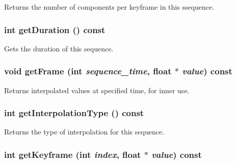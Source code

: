 Returns the number of components per keyframe in this ssequence. \hypertarget{classm3g_1_1KeyframeSequence_995a5ca5c8c3c993ef167f67cbb5fabe}{
\subsubsection[{getDuration}]{\setlength{\rightskip}{0pt plus 5cm}int getDuration () const}}
\label{classm3g_1_1KeyframeSequence_995a5ca5c8c3c993ef167f67cbb5fabe}


Gets the duration of this sequence. \hypertarget{classm3g_1_1KeyframeSequence_89be810f096d4f4f6028ca556c7f5f05}{
\subsubsection[{getFrame}]{\setlength{\rightskip}{0pt plus 5cm}void getFrame (int {\em sequence\_\-time}, \/  float $\ast$ {\em value}) const}}
\label{classm3g_1_1KeyframeSequence_89be810f096d4f4f6028ca556c7f5f05}


Returns interpolated values at specified time, for inner use. \hypertarget{classm3g_1_1KeyframeSequence_0d46321e7f46e037508cce88cdf6a487}{
\subsubsection[{getInterpolationType}]{\setlength{\rightskip}{0pt plus 5cm}int getInterpolationType () const}}
\label{classm3g_1_1KeyframeSequence_0d46321e7f46e037508cce88cdf6a487}


Returns the type of interpolation for this sequence. \hypertarget{classm3g_1_1KeyframeSequence_0fd27047149eedab8b10319768e1fe9a}{
\subsubsection[{getKeyframe}]{\setlength{\rightskip}{0pt plus 5cm}int getKeyframe (int {\em index}, \/  float $\ast$ {\em value}) const}}
\label{classm3g_1_1KeyframeSequence_0fd27047149eedab8b10319768e1fe9a}


